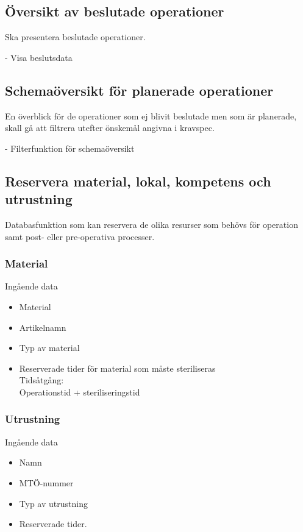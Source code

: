 \documentclass[a4paper,10pt]{article}
\begin{document}
\subsection{Översikt av beslutade operationer}

Ska presentera beslutade operationer.

-	Visa beslutsdata
\subsection{Schemaöversikt för planerade operationer}

En överblick för de operationer som ej blivit beslutade men som är planerade, skall gå att filtrera utefter önskemål angivna i kravspec.

-	Filterfunktion för schemaöversikt

\clearpage
\subsection{Reservera material, lokal, kompetens och utrustning}

Databasfunktion som kan reservera de olika resurser som behövs för operation samt post- eller pre-operativa processer.
\subsubsection{Material}
Ingående data
\begin{multicols}{2}
\begin{itemize}
	\item Material
	\item Artikelnamn
	\item Typ av material
	\item Reserverade tider för material som måste steriliseras \\Tidsåtgång: \\ Operationstid + steriliseringstid
\end{itemize}
\end{multicols}

\subsubsection{Utrustning}
Ingående data
\begin{multicols}{2}
\begin{itemize}
	\item Namn
	\item MTÖ-nummer
	\item Typ av utrustning
	\item Reserverade tider.
\end{itemize}
\end{multicols}
\end{document}
